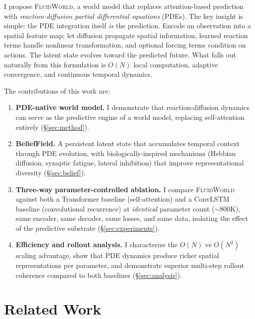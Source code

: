 \documentclass{article}
\newcommand{\fluidworld}{\textsc{FluidWorld}}
\begin{document}
I propose \fluidworld{}, a world model that replaces attention-based prediction with \emph{reaction-diffusion partial differential equations} (PDEs). The key insight is simple: the PDE integration itself \emph{is} the prediction. Encode an observation into a spatial feature map; let diffusion propagate spatial information, learned reaction terms handle nonlinear transformation, and optional forcing terms condition on actions. The latent state evolves toward the predicted future. What falls out naturally from this formulation is $O(N)$ local computation, adaptive convergence, and continuous temporal dynamics.

The contributions of this work are:
\begin{enumerate}
    \item \textbf{PDE-native world model.} I demonstrate that reaction-diffusion dynamics can serve as the predictive engine of a world model, replacing self-attention entirely (\S\ref{sec:method}).
    \item \textbf{BeliefField.} A persistent latent state that accumulates temporal context through PDE evolution, with biologically-inspired mechanisms (Hebbian diffusion, synaptic fatigue, lateral inhibition) that improve representational diversity (\S\ref{sec:belief}).
    \item \textbf{Three-way parameter-controlled ablation.} I compare \fluidworld{} against both a Transformer baseline (self-attention) and a ConvLSTM baseline (convolutional recurrence) at \emph{identical} parameter count ($\sim$800K), same encoder, same decoder, same losses, and same data, isolating the effect of the predictive substrate (\S\ref{sec:experiments}).
    \item \textbf{Efficiency and rollout analysis.} I characterize the $O(N)$ vs $O(N^2)$ scaling advantage, show that PDE dynamics produce richer spatial representations per parameter, and demonstrate superior multi-step rollout coherence compared to both baselines (\S\ref{sec:analysis}).
\end{enumerate}

\section{Related Work}
\label{sec:related}
\end{document}
